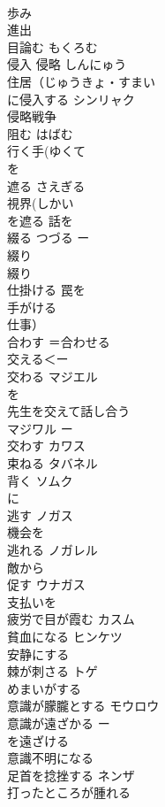 \documentclass[8pt]{extreport}
\begin{document}
\begin{CJK}{UTF8}{min}
\\	歩み 
\\	進出	
\\	目論む	もくろむ 
\\	侵入 侵略	しんにゅう
\\	住居（じゅうきょ・すまい 
\\	に侵入する シンリャク 
\\	侵略戦争 
\\	阻む	はばむ 
\\	行く手(ゆくて 
\\	を
\\	遮る	さえぎる 
\\	視界(しかい 
\\	を遮る 話を
\\	綴る	つづる ー
\\	綴り 
\\	綴り 
\\	仕掛ける	罠を 
\\	手がける	
\\	仕事）
\\	合わす	＝合わせる
\\	交える＜ー
\\	交わる	マジエル 
\\	を 
\\	先生を交えて話し合う 
\\	マジワル ー
\\	交わす	カワス 
\\	束ねる	タバネル 
\\	背く	ソムク 
\\	に
\\	逃す	ノガス 
\\	機会を
\\	逃れる	ノガレル 
\\	敵から
\\	促す	ウナガス 
\\	支払いを 
\\	疲労で目が霞む	カスム 
\\	貧血になる	ヒンケツ 
\\	安静にする	
\\	棘が刺さる	トゲ 
\\	めまいがする	
\\	意識が朦朧とする	モウロウ 
\\	意識が遠ざかる ー
\\	を遠ざける	
\\	意識不明になる	
\\	足首を捻挫する	ネンザ 
\\	打ったところが腫れる	

\end{CJK}
\end{document}
